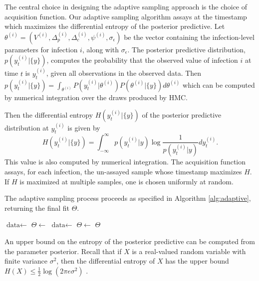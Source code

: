 \documentclass[11pt,notitlepage]{article}
\begin{document}
The central choice in designing the adaptive sampling approach is the choice of acquisition function.
Our adaptive sampling algorithm assays at the timestamp which maximizes the differential entropy of the posterior predictive.
Let $\theta^{(i)} = (V^{(i)} , \Delta_p^{(i)}, \Delta_c^{(i)}, \psi^{(i)}, \sigma_\epsilon)$ be the vector containing the infection-level parameters for infection $i$, along with $\sigma_\epsilon$.
The posterior predictive distribution, $p(y_t^{(i)} | \{y\})$, computes the probability that the observed value of infection $i$ at time $t$ is $y_t^{(i)}$, given all observations in the observed data.
Then $p(y_t^{(i)} | \{y\}) = \int_{\theta^{(i)}} P(y_t^{(i)} | \theta^{(i)})P(\theta^{(i)} | \{y\}) d\theta^{(i)}$ which can be computed by numerical integration over the draws produced by HMC.

Then the differential entropy $H(y_t^{(i)} | \{y\})$ of the posterior predictive distribution at $y_t^{(i)}$ is given by
\begin{equation*}
    H(y_t^{(i)} | \{y\}) = \int_{-\infty}^{\infty} p(y_t^{(i)} | {y}) \log \frac{1}{p(y_t^{(i)} | {y})} dy_t^{(i)}.
\end{equation*}
This value is also computed by numerical integration.
The acquisition function assays, for each infection, the un-assayed sample whose timestamp maximizes $H$.
If $H$ is maximized at multiple samples, one is chosen uniformly at random.

The adaptive sampling process proceeds as specified in Algorithm \ref{alg:adaptive}, returning the final fit $\Theta$.

\begin{algorithm}
\caption{Adaptive sampling}\label{alg:adaptive}
\begin{algorithmic}[1]   %
    \State $\text{data} \gets$ 
    \State $\Theta \gets$ 
        \State $\text{data} \gets$ 
        \State $\Theta \gets$ 
    \EndWhile
    \State \Return $\Theta$
\end{algorithmic}
\end{algorithm}

An upper bound on the entropy of the posterior predictive can be computed from the parameter posterior.
Recall that if $X$ is a real-valued random variable with finite variance $\sigma^2$, then the differential entropy of $X$ has the upper bound $H(X) \leq \frac{1}{2} \log (2 \pi e \sigma^2)$ \cite{?}.
\end{document}
